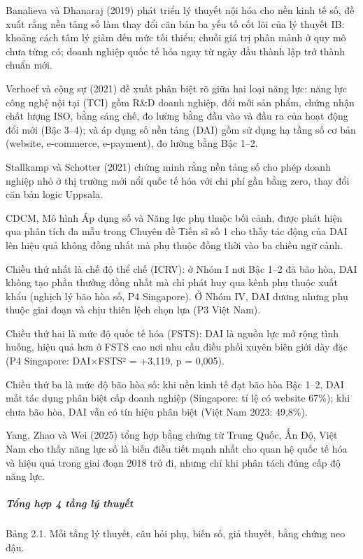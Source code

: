 \documentclass[
  a4paper,
  13pt]{extreport}
\begin{document}
Banalieva và Dhanaraj (2019) phát triển lý thuyết nội hóa cho nền kinh
tế số, đề xuất rằng nền tảng số làm thay đổi căn bản ba yếu tố cốt lõi
của lý thuyết IB: khoảng cách tâm lý giảm đến mức tối thiểu; chuỗi giá
trị phân mảnh ở quy mô chưa từng có; doanh nghiệp quốc tế hóa ngay từ
ngày đầu thành lập trở thành chuẩn mới.

Verhoef và cộng sự (2021) đề xuất phân biệt rõ giữa hai loại năng lực:
năng lực công nghệ nội tại (TCI) gồm R\&D doanh nghiệp, đổi mới sản
phẩm, chứng nhận chất lượng ISO, bằng sáng chế, đo lường bằng đầu vào và
đầu ra của hoạt động đổi mới (Bậc 3--4); và áp dụng số nền tảng (DAI)
gồm sử dụng hạ tầng số cơ bản (website, e-commerce, e-payment), đo lường
bằng Bậc 1--2.

Stallkamp và Schotter (2021) chứng minh rằng nền tảng số cho phép doanh
nghiệp nhỏ ở thị trường mới nổi quốc tế hóa với chi phí gần bằng zero,
thay đổi căn bản logic Uppsala.

CDCM, Mô hình Áp dụng số và Năng lực phụ thuộc bối cảnh, được phát hiện
qua phân tích đa mẫu trong Chuyên đề Tiến sĩ số 1 cho thấy tác động của
DAI lên hiệu quả không đồng nhất mà phụ thuộc đồng thời vào ba chiều ngữ
cảnh.

Chiều thứ nhất là chế độ thể chế (ICRV): ở Nhóm I nơi Bậc 1--2 đã bão
hòa, DAI không tạo phần thưởng đồng nhất mà chỉ phát huy qua kênh phụ
thuộc xuất khẩu (nghịch lý bão hòa số, P4 Singapore). Ở Nhóm IV, DAI
dương nhưng phụ thuộc giai đoạn và chịu thiên lệch chọn lựa (P3 Việt
Nam).

Chiều thứ hai là mức độ quốc tế hóa (FSTS): DAI là nguồn lực mở rộng
tình huống, hiệu quả hơn ở FSTS cao nơi nhu cầu điều phối xuyên biên
giới dày đặc (P4 Singapore: DAI×FSTS² = +3,119, p = 0,005).

Chiều thứ ba là mức độ bão hòa số: khi nền kinh tế đạt bão hòa Bậc 1--2,
DAI mất tác dụng phân biệt cấp doanh nghiệp (Singapore: tỉ lệ có website
67\%); khi chưa bão hòa, DAI vẫn có tín hiệu phân biệt (Việt Nam 2023:
49,8\%).

Yang, Zhao và Wei (2025) tổng hợp bằng chứng từ Trung Quốc, Ấn Độ, Việt
Nam cho thấy năng lực số là biến điều tiết mạnh nhất cho quan hệ quốc tế
hóa và hiệu quả trong giai đoạn 2018 trở đi, nhưng chỉ khi phân tách
đúng cấp độ năng lực.

\hypertarget{tux1ed5ng-hux1ee3p-4-tux1ea7ng-luxfd-thuyux1ebft}{%
\subparagraph{Tổng hợp 4 tầng lý
thuyết}\label{tux1ed5ng-hux1ee3p-4-tux1ea7ng-luxfd-thuyux1ebft}}

Bảng 2.1. Mỗi tầng lý thuyết, câu hỏi phụ, biến số, giả thuyết, bằng
chứng neo đậu.
\end{document}
